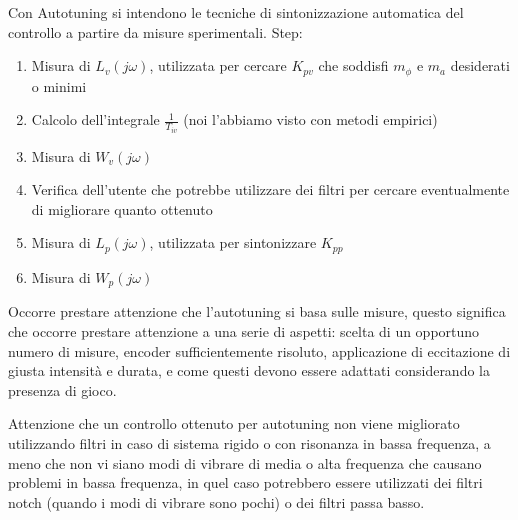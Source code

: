 Con Autotuning si intendono le tecniche di sintonizzazione automatica del controllo a partire da misure sperimentali.
Step:
\begin{enumerate}
    \item Misura di \(L_v(j\omega)\), utilizzata per cercare \(K_{pv}\) che soddisfi \(m_\phi\) e \(m_a\) desiderati o minimi
    \item Calcolo dell'integrale \(\frac{1}{T_{iv}}\) (noi l'abbiamo visto con metodi empirici)
    \item Misura di \(W_v(j\omega)\)
    \item Verifica dell'utente che potrebbe utilizzare dei filtri per cercare eventualmente di migliorare quanto ottenuto
    \item Misura di \(L_p(j\omega)\), utilizzata per sintonizzare \(K_{pp}\)
    \item Misura di \(W_p(j\omega)\)
\end{enumerate}

Occorre prestare attenzione che l'autotuning si basa sulle misure, questo significa che occorre prestare attenzione a una serie di aspetti: scelta di un opportuno numero di misure, encoder sufficientemente risoluto, applicazione di eccitazione di giusta intensità e durata, e come questi devono essere adattati considerando la presenza di gioco.

Attenzione che un controllo ottenuto per autotuning non viene migliorato utilizzando filtri in caso di sistema rigido o con risonanza in bassa frequenza, a meno che non vi siano modi di vibrare di media o alta frequenza che causano problemi in bassa frequenza, in quel caso potrebbero essere utilizzati dei filtri notch (quando i modi di vibrare sono pochi) o dei filtri passa basso.